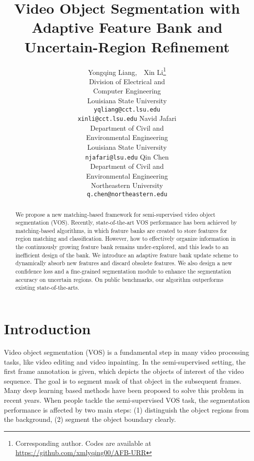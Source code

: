 \documentclass{article}
\title{Video Object Segmentation with Adaptive Feature Bank and Uncertain-Region Refinement}
\author{Yongqing Liang,~~Xin Li\thanks{Corresponding author. Codes are available at \url{https://github.com/xmlyqing00/AFB-URR}}\\
        Division of Electrical and\\
        Computer Engineering\\
        Louisiana State University\\
        \texttt{yqliang@cct.lsu.edu} \\
        \texttt{xinli@cct.lsu.edu}
\And Navid Jafari\\
        Department of Civil and \\
        Environmental Engineering\\
        Louisiana State University\\
        \texttt{njafari@lsu.edu}
    \And Qin Chen\\
        Department of Civil and \\
        Environmental Engineering\\
        Northeastern University\\
        \texttt{q.chen@northeastern.edu}
}
\begin{document}
\maketitle

\begin{abstract}
We propose a new matching-based framework for semi-supervised video object segmentation (VOS). Recently, state-of-the-art VOS performance has been achieved by matching-based algorithms, in which feature banks are created to store features for region matching and classification. 
However, how to effectively organize information in the continuously growing feature bank remains under-explored, and this leads to an inefficient design of the bank.  
We introduce an adaptive feature bank update scheme to dynamically absorb new features and discard obsolete features. 
We also design a new confidence loss and a fine-grained segmentation module to enhance the segmentation accuracy on uncertain regions. 
On public benchmarks, our algorithm outperforms existing state-of-the-arts. 

\end{abstract}

\section{Introduction}

Video object segmentation (VOS) is a fundamental step in many video processing tasks, like video editing and video inpainting.
In the semi-supervised setting, the first frame annotation is given, which depicts the objects of interest of the video sequence.
The goal is to segment mask of that object in the subsequent frames.
Many deep learning based methods have been proposed to solve this problem in recent years.
When people tackle the semi-supervised VOS task, the segmentation performance is affected by two main steps: (1) distinguish the object regions from the background, (2) segment the object boundary clearly.
\end{document}
